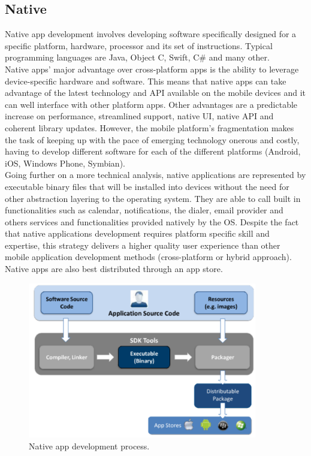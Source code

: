 \subsection{Native}
Native app development involves developing software specifically designed for a specific platform, hardware, processor and its set of instructions. Typical programming languages are  Java, Object C,  Swift, C\# and many other.\\
Native apps’ major advantage over cross-platform apps is the ability to leverage device-specific hardware and software. This means that native apps can take advantage of the latest technology and API available on the mobile devices and it can well interface with other platform apps. Other advantages are a predictable increase on performance, streamlined support, native UI, native API and coherent library updates. However, the mobile platform’s fragmentation makes the task of keeping up with the pace of emerging technology onerous and costly, having to develop different software for each of the different platforms (Android, iOS, Windows Phone, Symbian).\\
Going further on a more technical analysis, native applications are represented by  executable binary files that will be installed into devices without the need for other abstraction layering to the operating system. They are able to call built in functionalities such as calendar, notifications, the dialer, email provider and others services and functionalities provided natively by the OS. Despite the fact that native applications development requires platform specific skill and expertise, this strategy delivers a higher quality user experience than other mobile application development methods (cross-platform or hybrid approach). Native apps are also best distributed through an app store.\cite{ref8}
\begin{figure}[ht!]
	\centering
	\includegraphics[width=100mm]{figures/ch6/2.png}
	\caption{Native app development process.}
	\label{fig6.2}
\end{figure}

